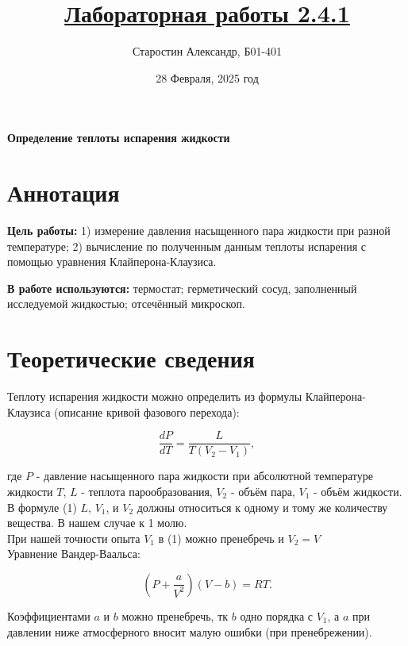 \documentclass[a4paper]{article}
\title{\underline{Лабораторная работы 2.4.1}}
\author{Старостин Александр, Б01-401}
\date {28 Февраля, 2025 год}
\begin{document}
\maketitle
\newpage

\textbf{Определение теплоты испарения жидкости}

\section{Аннотация}
    \par \textbf{Цель работы:} 1) измерение давления насыщенного пара жидкости при разной температуре; 2) вычисление по полученным данным теплоты испарения с помощью уравнения Клайперона-Клаузиса. \\

    \par \textbf{В работе используются:} термостат; герметический сосуд, заполненный исследуемой жидкостью; отсечённый микроскоп.

\section{Теоретические сведения}

Теплоту испарения жидкости можно определить из формулы Клайперона-Клаузиса (описание кривой фазового перехода):

\begin{equation}
	\frac{dP}{dT} = \frac{L}{T(V_2 - V_1)},
\end{equation}

где $P$ - давление насыщенного пара жидкости при абсолютной температуре жидкости $T$, $L$ - теплота парообразования, $V_2$ - объём пара, $V_1$ - объём жидкости. \\

В формуле (1) $L$, $V_1$, и $V_2$ должны относиться к одному и тому же количеству вещества. В нашем случае к 1 молю.   \\


При нашей точности опыта $V_1$ в (1) можно пренебречь и $V_2 = V$ \\

Уравнение Вандер-Ваальса:

\begin{equation}
	(P + \frac{a}{V^2})(V-b) = RT.
\end{equation}


Коэффициентами $a$ и $b$ можно пренебречь, тк $b$ одно порядка с $V_1$, а $a$ при давлении ниже атмосферного вносит малую ошибки (при пренебрежении). \\
\end{document}
